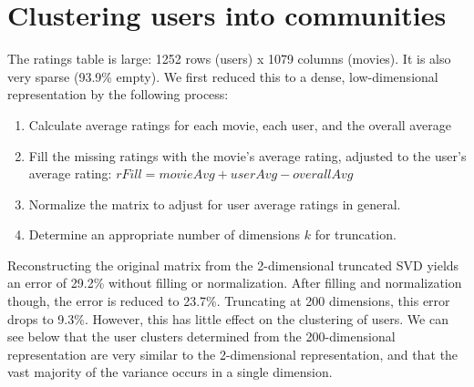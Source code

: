 \documentclass[11pt]{article}
\begin{document}
\section{Clustering users into communities}

The ratings table is large: 1252 rows (users) x 1079 columns (movies). It is also very sparse (93.9\% empty). We first reduced this to a dense, low-dimensional representation by the following process:
\begin{enumerate}
    \item Calculate average ratings for each movie, each user, and the overall average
    \item Fill the missing ratings with the movie's average rating, adjusted to the user's average rating: $rFill = movieAvg + userAvg - overallAvg$
    \item Normalize the matrix to adjust for user average ratings in general.
    \item Determine an appropriate number of dimensions $k$ for truncation.
\end{enumerate}
Reconstructing the original matrix from the 2-dimensional truncated SVD yields an error of 29.2\% without filling or normalization. After filling and normalization though, the error is reduced to 23.7\%. Truncating at 200 dimensions, this error drops to 9.3\%. However, this has little effect on the clustering of users. We can see below that the user clusters determined from the 200-dimensional representation are very similar to the 2-dimensional representation, and that the vast majority of the variance occurs in a single dimension.
\end{document}
